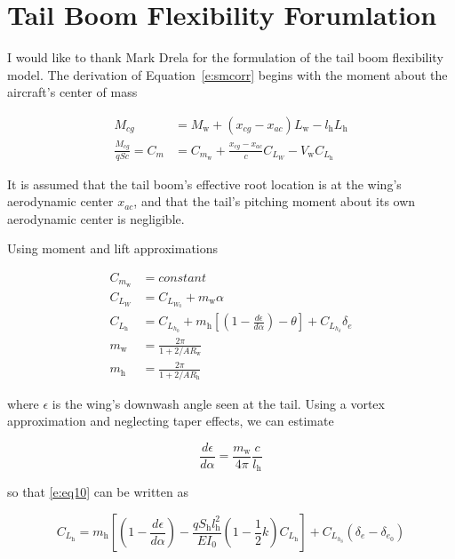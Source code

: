 \chapter{Tail Boom Flexibility Forumlation}

I would like to thank Mark Drela for the formulation of the tail boom flexibility model.
The derivation of Equation~\eqref{e:smcorr} begins with the moment about the aircraft's center of mass

\begin{align}
    \label{e:mcenter}
    M_{cg} &= M_{\text{w}} + (x_{cg} - x_{ac})L_{\text{w}} - l_{\text{h}} L_{\text{h}} \\
    \label{e:eq6}
    \frac{M_{cg}}{qSc} = C_m &= C_{m_{\text{w}}} + \frac{x_{cg} - x_{ac}}{c} C_{L_W} - V_{\text{w}} C_{L_{\text{h}}}
\end{align}

It is assumed that the tail boom's effective root location is at the wing's aerodynamic center $x_{ac}$, and that the tail's pitching moment about its own aerodynamic center is negligible. 

Using moment and lift approximations

\begin{align}
    C_{m_{\text{w}}} &= constant \\
    C_{L_W} &= C_{L_{W_0}} + m_{\text{w}} \alpha \\
    \label{e:eq10}
    C_{L_{\text{h}}} &= C_{L_{h_0}} + m_{\text{h}} \left[\left( 1 - \frac{d\epsilon}{d\alpha}\right) - \theta \right] + C_{L_{h_{\delta}}}\delta_e \\
    m_{\text{w}} &= \frac{2\pi}{1 + 2/AR_{\text{w}}} \\
    m_{\text{h}} &= \frac{2\pi}{1 + 2/AR_{\text{h}}}
\end{align}

where $\epsilon$ is the wing's downwash angle seen at the tail. Using a vortex approximation and neglecting taper effects, we can estimate

\begin{equation}
    \frac{d\epsilon}{d\alpha} = \frac{m_{\text{w}}}{4\pi} \frac{c}{l_{\text{h}}}
\end{equation}

so that \eqref{e:eq10} can be written as

\begin{equation}
    C_{L_{\text{h}}} = m_{\text{h}} \left[\left( 1 - \frac{d\epsilon}{d\alpha}\right) - \frac{qS_{\text{h}}l_{\text{h}}^2}{EI_0}(1-\frac{1}{2}k) C_{L_{\text{h}}}\right] + C_{L_{h_{\delta}}}(\delta_e - \delta_{e_0}) 
\end{equation}

